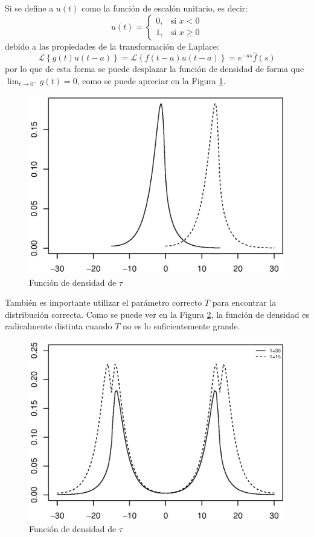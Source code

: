 \documentclass[11pt]{article}
\numberwithin{equation}{section} %
\begin{document}
Si se define a $u(t)$ como la función de escalón unitario, es decir:
\[
u(t) =
\begin{cases}
0, & \mbox{si } x<0 \\
1, & \mbox{si } x\geq0
\end{cases}
\]
debido a las propiedades de la transformación de Laplace:
\[
\mathcal{L} \left\{g(t)u(t-a)\right\}=\mathcal{L} \left\{f(t-a)u(t-a)\right\}=e^{-as}\hat{f}(s)
\]
por lo que de esta forma se puede desplazar la función de densidad de forma que $\lim_{t\to 0^-} g(t)=0$, como se puede apreciar en la Figura \ref{probmtshift}.\\

\begin{figure}[htbp] \centering
\includegraphics[scale=0.75,trim=0 1cm 0 1cm]{probpmshift.eps}
\caption{Función de densidad de $\tau$}
\label{probmtshift}
\end{figure}

También es importante utilizar el parámetro correcto $T$ para encontrar la distribución correcta. Como se puede ver en la Figura \ref{probmtpar}, la función de densidad es radicalmente distinta cuando $T$ no es lo suficientemente grande.

\begin{figure}[htbp] \centering
\includegraphics[scale=0.75,trim=0 1cm 0 1cm]{probpmpar.eps}
\caption{Función de densidad de $\tau$}
\label{probmtpar}
\end{figure}
\end{document}

